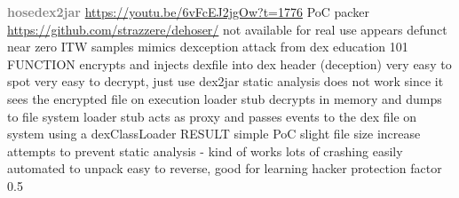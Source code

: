 \newline\newline\textbf{\textcolor{gray}{hosedex2jar}}\newline
\url{https://youtu.be/6vFcEJ2jgOw?t=1776}\newline
PoC packer\newline
\url{https://github.com/strazzere/dehoser/}\newline
not available for real use\newline
appears defunct\newline
near zero ITW samples\newline
mimics dexception attack from dex education 101\newline
FUNCTION\newline
encrypts and injects dexfile into dex header (deception)\newline
very easy to spot\newline
very easy to decrypt, just use dex2jar\newline
static analysis does not work since it sees the encrypted file\newline
on execution loader stub decrypts in memory and dumps to file system\newline
loader stub acts as proxy and passes events to the dex file on system using a dexClassLoader\newline
RESULT\newline
simple PoC\newline
slight file size increase\newline
attempts to prevent static analysis - kind of works\newline
lots of crashing\newline
easily automated to unpack\newline
easy to reverse, good for learning\newline
hacker protection factor 0.5
